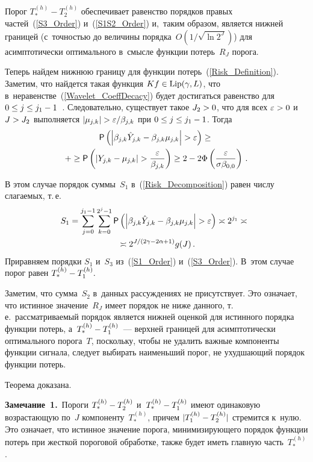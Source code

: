 \begin{multicols}{2}
Порог $T_*^{(h)}-T_2^{(h)}$
обеспечивает равенство порядков правых час\-тей~(\ref{S3_Order}) и~(\ref{S1S2_Order}) 
и,~таким образом, является нижней границей (с~точ\-ностью до величины 
порядка~$O(1/\sqrt{\ln 2^J})$) для асимптотически оптимального в~смыс\-ле
 функции потерь~$R_J$ порога.

Теперь найдем нижнюю границу для функции потерь~(\ref{Risk_Definition}). 
Заметим, что найдется такая функция $Kf\hm\in\mathrm{Lip}(\gamma,L)$, 
что в~неравенстве~(\ref{Wavelet_CoeffDecacy}) будет достигаться равенство 
для $0\hm\leq j\hm\leq j_1-1$~\cite{Mal99}. Следовательно, существует такое $J_2\hm>0$, 
что для всех $\varepsilon\hm>0$ и~$J\hm>J_2$ выполняется $|\mujk|
\hm>\varepsilon/\betajk$ при $0\hm\leq j\hm\leq j_1-1$. Тогда
\begin{multline*}
{\sf P}\left(\left|\betajk\hat{Y}_{j,k}-\betajk\mujk\right|>\varepsilon\right)\geq{}\\
{}+\geq
{\sf P}\left(\left|Y_{j,k}-\mujk\right|>\fr{\varepsilon}{\betajk}\right)\geq
2-2\Phi\left(\fr{\varepsilon}{\sigma\beta_{0,0}}\right)\,.
\end{multline*}

В этом случае порядок суммы~$S_1$ в~(\ref{Risk_Decomposition}) равен чис\-лу 
сла\-га\-емых, т.\,е.
\begin{multline}
\hspace*{-3.23184pt}S_1=\sum\limits_{j=0}^{j_1-1}\sumk{\sf P}
\left(\left|\betajk\hat{Y}_{j,k}-\betajk\mujk\right|>\varepsilon\right)\asymp
 2^{j_1}\asymp{}\\
 {}\asymp 2^{{J}/({2\gamma-2\alpha+1})}g(J)\,.
\label{S1_Order}
\end{multline}
Приравняем порядки $S_1$ и~$S_3$ из~(\ref{S1_Order}) и~(\ref{S3_Order}). 
В~этом случае порог равен $T_*^{(h)}\hm-T_1^{(h)}.$

Заметим, что сумма~$S_2$ в~данных рассуждениях не присутствует. Это означает, 
что истинное значение~$R_J$ имеет порядок не ниже данного, т.\,е.\
 рас\-смат\-ри\-ва\-емый порядок является нижней оценкой для истинного порядка 
 функции потерь, а~$T_*^{(h)}\hm-T_1^{(h)}$~--- 
 верхней границей для асимптотически оптимального порога~$T$, 
 поскольку, чтобы не удалить важ\-ные компоненты функции сигнала, следует 
 выбирать наименьший порог, не ухудшающий порядок функции потерь.

Теорема доказана.

\smallskip

\noindent
\textbf{Замечание~1.}\ Пороги $T_*^{(h)}\hm-T_2^{(h)}$ и~$T_*^{(h)}\hm-T_1^{(h)}$ 
имеют одинаковую воз\-рас\-та\-ющую по~$J$ компоненту~$T_*^{(h)}$, причем 
$|T_1^{(h)}\hm-T_2^{(h)}|$ стремится к~нулю. Это означает, что истинное значение 
порога, ми\-ни\-ми\-зи\-ру\-юще\-го порядок функции потерь при жест\-кой пороговой обработке, 
так\-же будет иметь главную часть~$T_*^{(h)}$.



\end{multicols}
